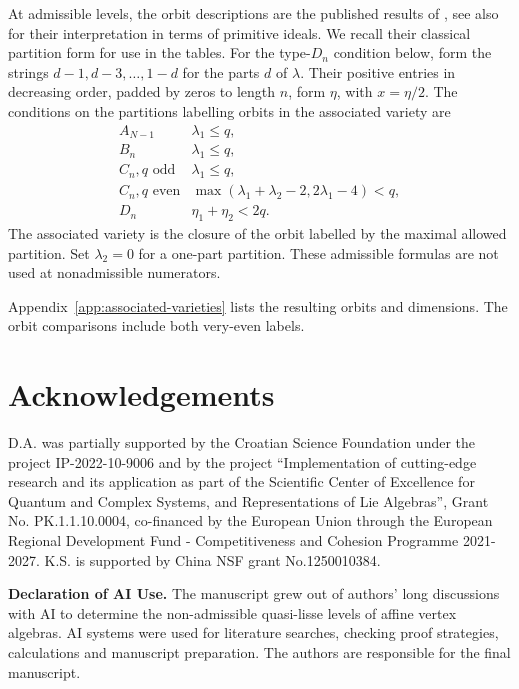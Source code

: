 \documentclass[11pt,a4paper]{amsart}
\numberwithin{equation}{section}
\theoremstyle{definition}
\theoremstyle{remark}
\begin{document}
At admissible levels, the orbit descriptions are the published results
of \cite[Theorems~5.7.1 and~5.8.1, Tables~2--10]{AAV}, see also
\cite{AVEM} for their interpretation in terms of primitive ideals.
We recall their classical partition form for use in the tables.
For the type-$D_n$ condition below, form the strings
$d-1,d-3,\ldots,1-d$ for the parts $d$ of $\lambda$. Their positive entries in
decreasing order, padded by zeros to length $n$, form $\eta$, with
$x=\eta/2$. The conditions on the partitions labelling orbits in the associated variety are
\begin{equation}\label{eq:admissible-partitions}
\begin{array}{c|l}
A_{N-1}&\lambda_1\le q,\\
B_n&\lambda_1\le q,\\
C_n, q\text{ odd}&\lambda_1\le q,\\
C_n, q\text{ even}&\max(\lambda_1+\lambda_2-2,2\lambda_1-4)<q,\\
D_n&\eta_1+\eta_2<2q.
\end{array}
\end{equation}
The associated variety is the closure of the orbit labelled by the
maximal allowed partition. Set
$\lambda_2=0$ for a one-part partition. These admissible formulas are not
used at nonadmissible numerators.

Appendix~\ref{app:associated-varieties} lists the resulting orbits and
dimensions. The orbit comparisons include both very-even labels.


\section*{Acknowledgements}    
D.A. was partially supported by the Croatian Science Foundation under the project IP-2022-10-9006  and by the project “Implementation of cutting-edge research and its application as part of the Scientific Center of
Excellence for Quantum and Complex Systems, and Representations of Lie Algebras”, Grant No. PK.1.1.10.0004, co-financed by the European Union through the European Regional Development Fund - Competitiveness and Cohesion Programme 2021-2027. 
K.S. is supported by China NSF grant No.1250010384. 

\vspace{5mm}
\noindent
\textbf{Declaration of AI Use.} 
The manuscript grew out of authors’ long discussions with AI to determine the non-admissible quasi-lisse levels of affine vertex algebras. AI systems were used for literature searches, checking proof strategies, calculations and manuscript preparation. The authors are responsible for the final manuscript. 
\end{document}
